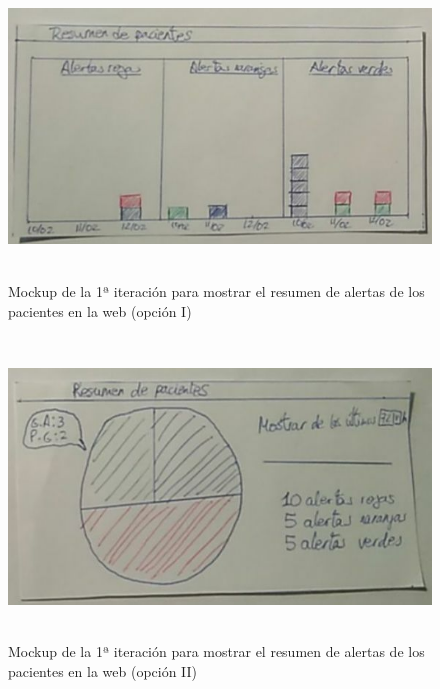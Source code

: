 \begin{figure}[H]
    \centering
    \includegraphics[width=0.7\linewidth, height=8cm]{Imagenes/04DescProblema/mockups/v1/web/08-alertas-2.png}
    \caption[Mockup de la 1ª iteración para mostrar el resumen de alertas de los pacientes en la web (opción I)]{Mockup de la 1ª iteración para mostrar el resumen de alertas de los pacientes en la web (opción I)}
    \label{c4:fig:v1:web:resumenAlertas2}
\end{figure}

\begin{figure}[H]
    \centering
    \includegraphics[width=0.7\linewidth, height=8cm]{Imagenes/04DescProblema/mockups/v1/web/08-alertas-3.png}
    \caption[Mockup de la 1ª iteración para mostrar el resumen de alertas de los pacientes en la web (opción II)]{Mockup de la 1ª iteración para mostrar el resumen de alertas de los pacientes en la web (opción II)}
    \label{c4:fig:v1:web:resumenAlertas3}
\end{figure}

